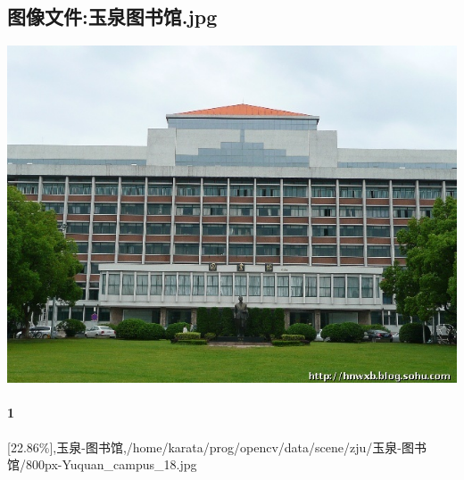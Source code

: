 \subsection{图像文件:玉泉图书馆.jpg}
\includegraphics[width=15cm,angle=0]{玉泉图书馆.jpg}

\paragraph{1}
[22.86\%],玉泉-图书馆,/home/karata/prog/opencv/data/scene/zju/玉泉-图书馆/800px-Yuquan\_campus\_18.jpg

